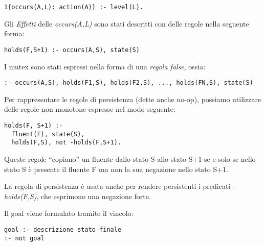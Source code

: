\begin{lstlisting}
1{occurs(A,L): action(A)} :- level(L).
\end{lstlisting}

Gli \emph{Effetti} delle \emph{occurs(A,L)} sono stati descritti con delle regole nella seguente forma:

\begin{lstlisting}
holds(F,S+1) :- occurs(A,S), state(S)
\end{lstlisting}

I mutex sono stati espressi nella forma di una \emph{regola false}, ossia:

\begin{lstlisting}
:- occurs(A,S), holds(F1,S), holds(F2,S), ..., holds(FN,S), state(S)
\end{lstlisting}

Per rappresentare le regole di persistenza (dette anche no-op), possiamo utilizzare delle regole non monotone espresse nel modo seguente:

\begin{lstlisting}
holds(F, S+1) :-
  fluent(F), state(S),
  holds(F,S), not -holds(F,S+1).
\end{lstlisting}

Queste regole ``copiano'' un fluente dallo stato S allo stato S+1 se e solo se nello stato S è presente il fluente F ma non la sua negazione nello stato S+1.

La regola di persistenza è usata anche per rendere persistenti i predicati \emph{-holds(F,S)}, che esprimono una negazione forte.

Il goal viene formulato tramite il vincolo:

\begin{lstlisting}
goal :- descrizione stato finale
:- not goal
\end{lstlisting}


